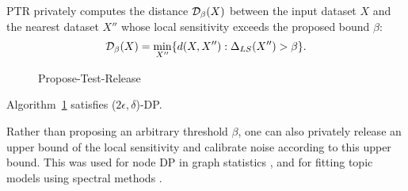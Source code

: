 


PTR privately computes the distance $\mathcal{D}_{\beta}(X)$ between the input dataset $X$ and the nearest dataset $X''$ whose local sensitivity exceeds the proposed bound $\beta$:
\begin{align*}
    \mathcal{D}_{\beta}(X) = \min\limits_{X''} \{ d(X, X''): \Delta_{LS}(X'')> \beta \}.
\end{align*}

\begin{figure}[H]
\vspace{-1.4em}
\centering
\begin{algorithm}[H]
\caption{Propose-Test-Release \citep{dwork2009differential}}
\label{alg:classic_ptr}
\begin{algorithmic}[1]

\end{algorithmic}
\end{algorithm}
\end{figure}
\begin{theorem} 
Algorithm~\ref{alg:classic_ptr} satisfies ($2 \epsilon, \delta$)-DP.
\citep{dwork2009differential}
\end{theorem}
Rather than proposing an arbitrary threshold $\beta$, one can also privately release an upper bound of the local sensitivity and calibrate noise according to this upper bound. This was used for node DP in graph statistics \citep{kasiviswanathan2013analyzing}, and for fitting topic models using spectral methods \citep{decarolis2020end}.

